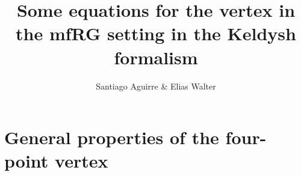 \documentclass[12pt,a4paper,roman]{article}
\begin{document}
%
\title{Some equations for the vertex in the mfRG setting in the Keldysh formalism}
%
%
\author{Santiago Aguirre \& Elias Walter}
%
%
%
\maketitle              %
%

%
%
%
\section*{General properties of the four-point vertex}
\end{document}
